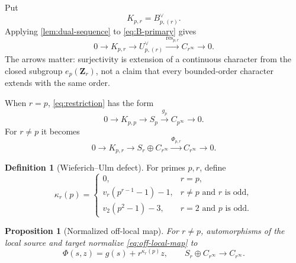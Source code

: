 \documentclass[11pt]{article}
\newtheorem{proposition}[theorem]{Proposition}
\theoremstyle{definition}
\newtheorem{definition}[theorem]{Definition}
\DeclareMathOperator{\res}{res}
\begin{document}
Put
\begin{equation}\label{eq:K-definition}
K_{p,r}=B_{p,(r)}^\vee.
\end{equation}
Applying \cref{lem:dual-sequence} to \eqref{eq:B-primary} gives
\begin{equation}\label{eq:restriction}
0\longrightarrow K_{p,r}\longrightarrow U_{p,(r)}^\vee
\xrightarrow{\res_{p,r}} C_{r^\infty}\longrightarrow0.
\end{equation}
The arrows matter: surjectivity is extension of a continuous character from
the closed subgroup $e_p(\mathbf Z_r)$, not a claim that every bounded-order
character extends with the same order.

When $r=p$, \eqref{eq:restriction} has the form
\begin{equation}\label{eq:diagonal-map}
0\longrightarrow K_{p,p}\longrightarrow S_p
\xrightarrow{g_p}C_{p^\infty}\longrightarrow0.
\end{equation}
For $r\ne p$ it becomes
\begin{equation}\label{eq:off-local-map}
0\longrightarrow K_{p,r}\longrightarrow S_r\oplus C_{r^\infty}
\xrightarrow{\Phi_{p,r}}C_{r^\infty}\longrightarrow0.
\end{equation}

\begin{definition}[Wieferich--Ulm defect]\label{def:kappa}
For primes $p,r$, define
\begin{equation}\label{eq:kappa}
\kappa_r(p)=
\begin{cases}
0,&r=p,\\[2pt]
v_r(p^{r-1}-1)-1,&r\ne p\text{ and }r\text{ is odd},\\[2pt]
v_2(p^2-1)-3,&r=2\text{ and }p\text{ is odd}.
\end{cases}
\end{equation}
\end{definition}

\begin{proposition}[Normalized off-local map]\label{prop:normalized-map}
For $r\ne p$, automorphisms of the local source and target normalize
\eqref{eq:off-local-map} to
\begin{equation}\label{eq:normalized-map}
\Phi(s,z)=g(s)+r^{\kappa_r(p)}z,
\qquad
S_r\oplus C_{r^\infty}\longrightarrow C_{r^\infty}.
\end{equation}
\end{proposition}
\end{document}
